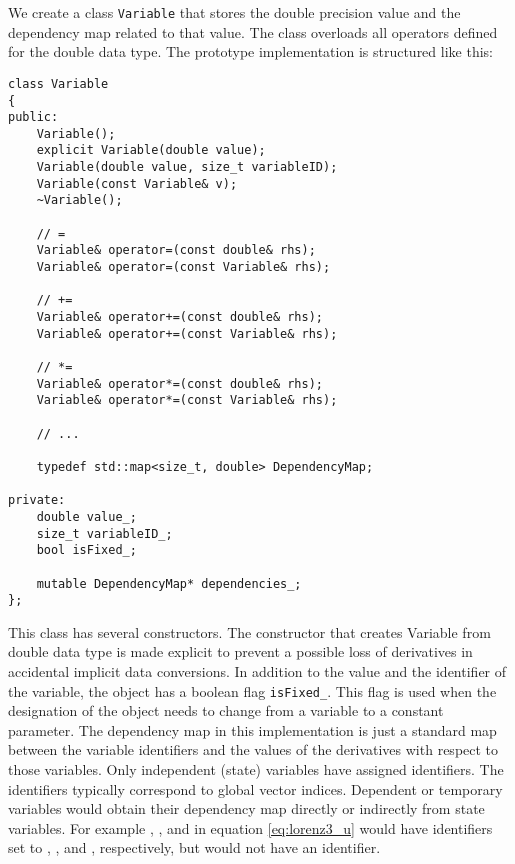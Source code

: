\documentclass[10pt]{ijnam}
\theoremstyle{definition}
\begin{document}
We create a class \texttt{Variable} that stores the double precision value and the dependency map 
related to that value. The class overloads all operators defined for the double 
data type. The prototype implementation is structured like this:
\begin{lstlisting}
class Variable
{
public:
    Variable();
    explicit Variable(double value);
    Variable(double value, size_t variableID);
    Variable(const Variable& v);
    ~Variable();
    
    // =
    Variable& operator=(const double& rhs);
    Variable& operator=(const Variable& rhs);
    
    // +=
    Variable& operator+=(const double& rhs);
    Variable& operator+=(const Variable& rhs);
    
    // *=
    Variable& operator*=(const double& rhs);
    Variable& operator*=(const Variable& rhs);
    
    // ...
    
    typedef std::map<size_t, double> DependencyMap;    
    
private:
    double value_;
    size_t variableID_;
    bool isFixed_;
    
    mutable DependencyMap* dependencies_;    
};
\end{lstlisting}
This class has several constructors. The constructor that creates Variable from double 
data type is made explicit to prevent a possible loss of derivatives in 
accidental implicit data conversions. In addition to the value and the
identifier of the variable, the object has a boolean flag \verb|isFixed_|. This flag is used when the
designation of the object needs to change from a variable to a constant parameter. 
The dependency map in this implementation is just a standard map between the variable 
identifiers and the values of the derivatives with respect to those variables. Only independent
(state) variables have assigned identifiers. The identifiers typically correspond to global vector 
indices. Dependent or temporary variables 
would obtain their dependency map directly or indirectly from state variables. For 
example , , and  in equation \eqref{eq:lorenz3_u} would have identifiers set to , , and , respectively, but  would not have an identifier.
\end{document}
